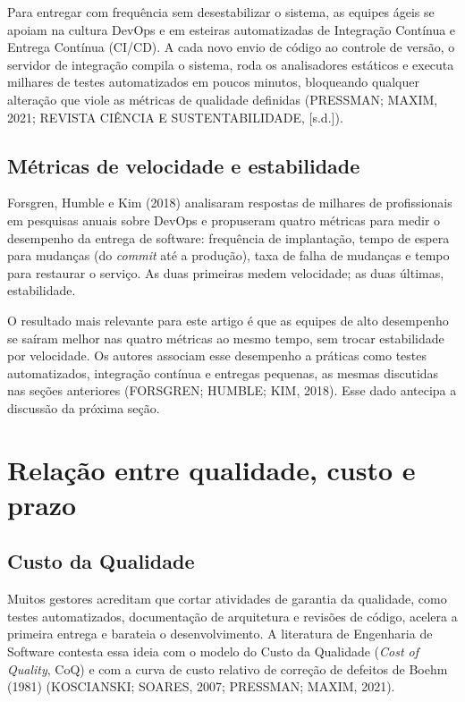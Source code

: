 \documentclass[12pt,a4paper]{article}
\begin{document}
Para entregar com frequência sem desestabilizar o sistema, as equipes ágeis se apoiam na cultura DevOps e em esteiras automatizadas de Integração Contínua e Entrega Contínua (CI/CD). A cada novo envio de código ao controle de versão, o servidor de integração compila o sistema, roda os analisadores estáticos e executa milhares de testes automatizados em poucos minutos, bloqueando qualquer alteração que viole as métricas de qualidade definidas (PRESSMAN; MAXIM, 2021; REVISTA CIÊNCIA E SUSTENTABILIDADE, [s.d.]).

\subsection{Métricas de velocidade e estabilidade}

Forsgren, Humble e Kim (2018) analisaram respostas de milhares de profissionais em pesquisas anuais sobre DevOps e propuseram quatro métricas para medir o desempenho da entrega de software: frequência de implantação, tempo de espera para mudanças (do \textit{commit} até a produção), taxa de falha de mudanças e tempo para restaurar o serviço. As duas primeiras medem velocidade; as duas últimas, estabilidade.

O resultado mais relevante para este artigo é que as equipes de alto desempenho se saíram melhor nas quatro métricas ao mesmo tempo, sem trocar estabilidade por velocidade. Os autores associam esse desempenho a práticas como testes automatizados, integração contínua e entregas pequenas, as mesmas discutidas nas seções anteriores (FORSGREN; HUMBLE; KIM, 2018). Esse dado antecipa a discussão da próxima seção.

\section{Relação entre qualidade, custo e prazo}
\label{sec:custo}

\subsection{Custo da Qualidade}

Muitos gestores acreditam que cortar atividades de garantia da qualidade, como testes automatizados, documentação de arquitetura e revisões de código, acelera a primeira entrega e barateia o desenvolvimento. A literatura de Engenharia de Software contesta essa ideia com o modelo do Custo da Qualidade (\textit{Cost of Quality}, CoQ) e com a curva de custo relativo de correção de defeitos de Boehm (1981) (KOSCIANSKI; SOARES, 2007; PRESSMAN; MAXIM, 2021).
\end{document}
